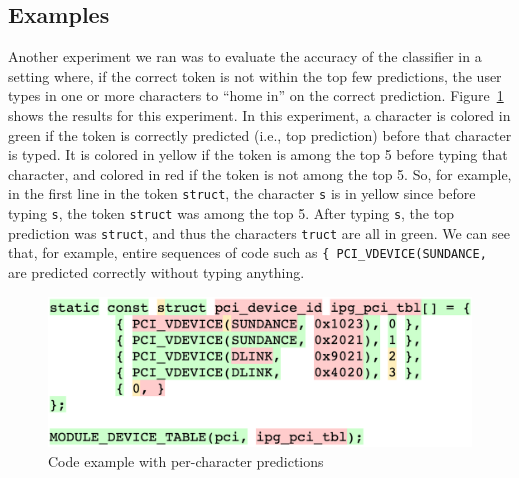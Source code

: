 \subsection{Examples}
\label{sec:examples}
Another experiment we ran was to evaluate the accuracy of the classifier in a
setting where, if the correct token is not within the top few predictions, the
user types in one or more characters to ``home in'' on the correct prediction.
Figure~\ref{fig:codeexample} shows the results for this experiment. In this
experiment, a character is colored in green if the token is correctly predicted
(i.e., top prediction) before that character is typed. It is colored in yellow
if the token is among the top 5 before typing that character, and colored in red
if the token is not among the top 5. So, for example, in the first line in the
token
{\tt struct}, the character {\tt s} is in yellow since before typing {\tt s}, the
token {\tt struct} was among the top 5. After typing {\tt s}, the top prediction
was {\tt struct}, and thus the characters {\tt truct} are all in green. We
can see that, for example, entire sequences of code such as {\tt \{
PCI\_VDEVICE(SUNDANCE, } are predicted correctly without typing anything.
\begin{figure}[h]
  \centering
  \includegraphics[width=\linewidth]{figs/example3.png}
  \caption{Code example with per-character predictions}
  \label{fig:codeexample}
\end{figure}

